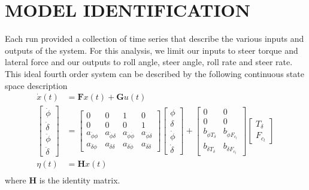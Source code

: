 \documentclass[twocolumn,10pt]{asme2e}
\begin{document}
\section*{MODEL IDENTIFICATION}
Each run provided a collection of time series that describe the various inputs
and outputs of the system. For this analysis, we limit our inputs to steer
torque and lateral force and our outputs to roll angle, steer angle, roll rate
and steer rate. This ideal fourth order system can be described by the
following continuous state space description
\begin{equation}
	\begin{split}
		\dot{x}(t) & =
		\mathbf{F}x(t) + \mathbf{G}u(t)\\
		\begin{bmatrix}
			\dot{\phi} \\
			\dot{\delta} \\
			\ddot{\phi} \\
			\ddot{\delta}
		\end{bmatrix}
		& =
		\begin{bmatrix}
			0 & 0 & 1 & 0\\
			0 & 0 & 0 & 1\\
			a_{\ddot{\phi}\phi} & a_{\ddot{\phi}\delta} &
			a_{\ddot{\phi}\dot{\phi}} & a_{\ddot{\phi}\dot{\delta}}\\
			a_{\ddot{\delta}\phi} & a_{\ddot{\delta}\delta} &
			a_{\ddot{\delta}\dot{\phi}} & a_{\ddot{\delta}\dot{\delta}}
		\end{bmatrix}
		\begin{bmatrix}
			\phi \\
			\delta \\
			\dot{\phi} \\
			\dot{\delta}
		\end{bmatrix}
		+
		\begin{bmatrix}
			0 & 0 \\
			0 & 0\\
			b_{\ddot{\phi}T_\delta} & b_{\ddot{\phi}F_{c_l}}\\
			b_{\ddot{\delta}T_\delta} & b_{\ddot{\delta}F_{c_l}}
		\end{bmatrix}
		\begin{bmatrix}
			T_\delta\\
			F_{c_l}
		\end{bmatrix}\\
		\eta(t) & = \mathbf{H}x(t)\\
	\end{split}
\end{equation}
where $\mathbf{H}$ is the identity matrix.
\end{document}
